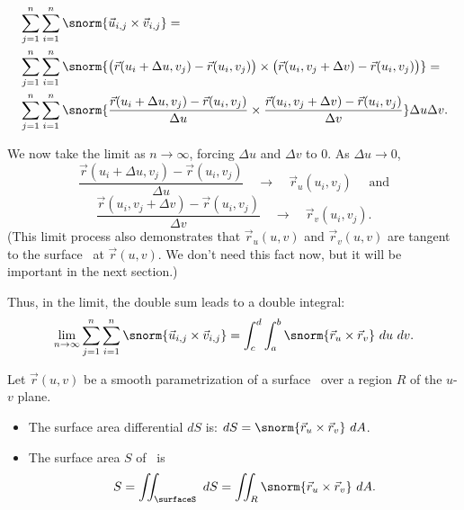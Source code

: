 \begin{align*}
&\sum_{j=1}^n\sum_{i=1}^n \snorm{\vec u_{i,j}\times \vec v_{i,j}}= \\ 
&\sum_{j=1}^n\sum_{i=1}^n \snorm{\big(\vec r(u_i+\Delta u,v_j) - \vec r(u_i,v_j)\big) \times \big(\vec r(u_i,v_j+\Delta v)-\vec r(u_i,v_j)\big)}= \\
&\sum_{j=1}^n\sum_{i=1}^n \snorm{\frac{\vec r(u_i+\Delta u,v_j) - \vec r(u_i,v_j)}{\Delta u} \times \frac{\vec r(u_i,v_j+\Delta v)-\vec r(u_i,v_j)}{\Delta v}}\Delta u\Delta v.
\end{align*}

We now take the limit as $n\to\infty$, forcing $\Delta u$ and $\Delta v$ to 0. As $\Delta u\to 0$,
$$\frac{\vec r(u_i+\Delta u,v_j) - \vec r(u_i,v_j)}{\Delta u}\quad \to\quad \vec r_u(u_i,v_j)\quad \text{ and} $$
$$\frac{\vec r(u_i,v_j+\Delta v)-\vec r(u_i,v_j)}{\Delta v}\quad \to\quad \vec r_v(u_i,v_j).$$
(This limit process also demonstrates that $\vec r_u(u,v)$ and $\vec r_v(u,v)$ are tangent to the surface \surfaceS\ at $\vec r(u,v)$. We don't need this fact now, but it will be important in the next section.)

Thus, in the limit, the double sum leads to a double integral:
$$\lim_{n\to\infty} \sum_{j=1}^n\sum_{i=1}^n \snorm{\vec u_{i,j}\times \vec v_{i,j}}= \int_c^d\int_a^b \snorm{\vec r_u\times\vec r_v}\ du\ dv.$$

{Let $\vec r(u,v)$ be a smooth parametrization of a surface \surfaceS\ over a region $R$ of the $u$-$v$ plane. 
\begin{itemize}
\item	The surface area differential $dS$ is: $dS = \snorm{\vec r_u\times \vec r_v}\ dA$.
\item The surface area $S$ of \surfaceS\ is
$$S = \iint_\surfaceS\ dS = \iint_R \snorm{\vec r_u\times \vec r_v}\ dA.$$
\end{itemize}
}

